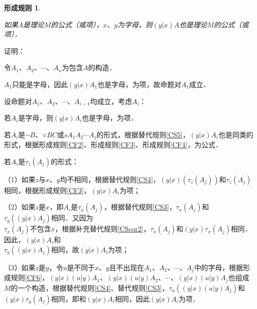 \documentclass[12pt, a4paper, oneside]{book}
\newtheorem{CF}{形成规则}
\begin{document}
			\begin{CF}\label{CF7}
				\hfill\par
				如果$A$是理论$M$的公式（或项），$x$、$y$为字母，则$(y|x)A$也是理论$M$的公式（或项）．
			\end{CF}
			证明：
			\par
			令$A_1$、$A_2$、$\cdots$、$A_n$为包含$A$的构造．
			\par
			$A_1$只能是字母，因此$(y|x)A_1$也是字母，为项，故命题对$A_1$成立．
			\par
			设命题对$A_1$、$A_2$、$\cdots$、$A_{i-1}$均成立，考虑$A_i$：
			\par
			若$A_i$是字母，则$(y|x)A_i$也是字母，为项．			
			\par
			若$A_i$是$\neg B$、$\lor BC$或$sA_1A_2\cdots A_j$的形式，根据替代规则\ref{CS5}，$(y|x)A_i$也是同类的形式，根据形成规则\ref{CF2}、形成规则\ref{CF3}、形成规则\ref{CF4}，为公式．
			\par
			若$A_i$是$\tau_z(A_j)$的形式：
			\par
			（1）如果$z$与$x$、$y$均不相同，根据替代规则\ref{CS4}，$(y|x)(\tau_z(A_j))$和$\tau_z(A_j)$相同，根据形成规则\ref{CF3}，$(y|x)A_i$为项；
			\par
			（2）如果$z$是$x$，即$A_i$是$\tau_x(A_j)$，根据替代规则\ref{CS3}，$\tau_x(A_j)$和$\tau_y((y|x)A_j)$相同．又因为\\$\tau_x(A_j)$不包含$x$，根据补充替代规则\ref{CScor2}，$\tau_x(A_j)$和$(y|x)\tau_x(A_j)$相同．因此，$(y|x)A_i$和\\$\tau_y((y|x)A_j)$相同，故$(y|x)A_i$为项；
			\par
			（3）如果$z$是$y$，令$u$是不同于$x$、$y$且不出现在$A_1$、$A_2$、$\cdots$、$A_j$中的字母，根据形成规则\ref{CF6}，$(y|x)(u|y)A_1$、$(y|x)(u|y)A_2$、$\cdots$、$(y|x)(u|y)A_j$也组成$M$的一个构造，根据替代规则\ref{CS4}、替代规则\ref{CS3}，$\tau_u((y|x)(u|y)A_j)$和$(y|x)\tau_y(A_j)$相同，即和$(y|x)A_i$相同，因此$(y|x)A_i$为项．
\end{document}
